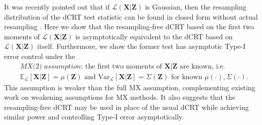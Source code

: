 \documentclass[12pt]{article}
\theoremstyle{definition}
\theoremstyle{remark}
\newcommand{\prx}{\bm X}
\newcommand{\prz}{\bm Z}
\newcommand{\srz}{Z}
\newcommand{\sry}{Y}
\begin{document}
It was recently pointed out that if $\mathcal L(\prx|\prz)$ is Gaussian, then the resampling distribution of the dCRT test statistic can be found in closed form without actual resampling \cite{Liu2020}. Here we show that the resampling-free dCRT based on the first two moments of $\mathcal L(\prx|\prz)$ is asymptotically equivalent to the dCRT based on $\mathcal L(\prx|\prz)$ itself. Furthermore, we show the former test has asymptotic Type-I error control under the
\begin{equation}
	\begin{split}
		&\textit{MX(2) assumption:} \text{ the first two moments of $\prx|\prz$ are known, i.e.} \\
		&\mathbb E_{\mathcal L}[\prx|\prz] = \mu(\prz) \text{ and } \text{Var}_{\mathcal L}[\prx|\prz] = \Sigma(\prz) \text{ for known } \mu(\cdot), \Sigma(\cdot).
		\label{MX(2)-intro}
	\end{split}
\end{equation}
This assumption is weaker than the full MX assumption, complementing existing work \cite{Huang2019, Barber2020} on weakening assumptions for MX methods. It also suggests that the resampling-free dCRT may be used in place of the usual dCRT while achieving similar power and controlling Type-I error asymptotically.





\end{document}
